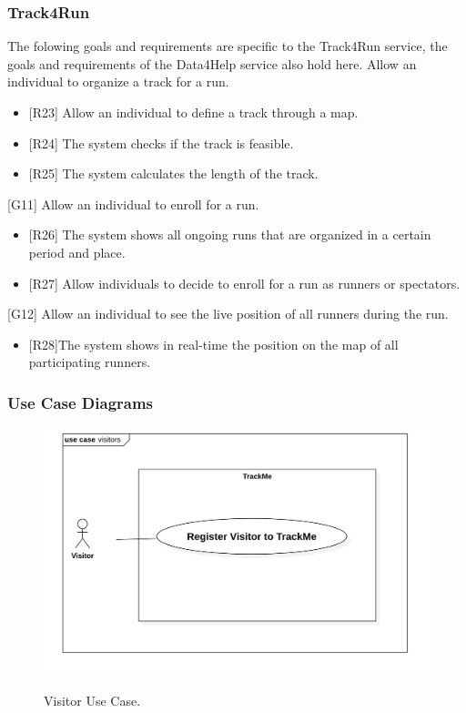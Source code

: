 \documentclass[12pt]{article}
\begin{document}
\subsubsection{Track4Run}
The folowing goals and requirements are specific to the Track4Run service, the goals and requirements of the Data4Help service also hold here.
\vspace{2mm}
\newline
[G10] Allow an individual to organize a track for a run.\newline
\begin{itemize}
    \item {[R23]} Allow an individual to define a track through a map. 
    \item {[R24]} The system checks if the track is feasible.
    \item {[R25]} The system calculates the length of the track. 
\end{itemize}
[G11] Allow an individual to enroll for a run.\newline 
\begin{itemize}
    \item {[R26]} The system shows all ongoing runs that are organized in a certain period and place. 
    \item {[R27]} Allow individuals to decide to enroll for a run as runners or spectators.
\end{itemize}
[G12] Allow an individual to see the live position of all runners during the run.\newline 
\begin{itemize}
    \item {[R28]}The system shows in real-time the position on the map of all participating runners.
\end{itemize}
\subsubsection{Use Case Diagrams}

\begin{figure}[H]
\includegraphics[scale=0.25]{VisitorUseCase.png}
\centering
\label{fig:VisitorUseCase}
\caption{Visitor Use Case.}
\end{figure}
\end{document}

